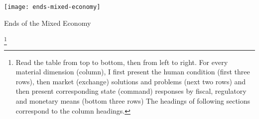 
\begin{landscape}
 \begin{table}[htbp]
	\begin{center}
	\texttt{[image: ends-mixed-economy]}
	\caption{Ends of the Mixed Economy \label{tab:ends-mixed-economy}}
\end{center}
\newpage
\end{table}
\end{landscape}\footnote{
Read the table from top to bottom, then from left to right.
For every material dimension (column), I first present the human condition (first three rows), then market (exchange) solutions and problems (next two rows) and then present corresponding state (command) responses by fiscal, regulatory and monetary means (bottom three rows)
The headings of following sections correspond to the column headings.

}
